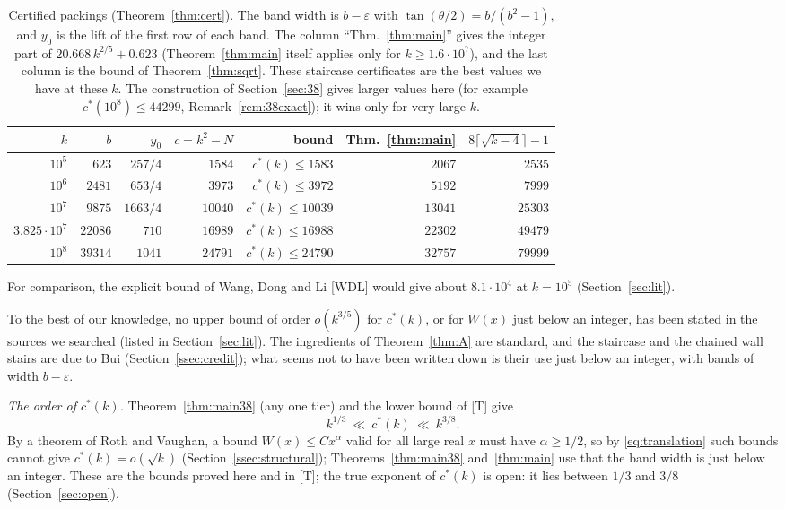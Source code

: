 \documentclass[11pt]{amsart}
\newcommand{\cs}{c^{*}}
\theoremstyle{definition}
\theoremstyle{remark}
\numberwithin{equation}{section}
\begin{document}
\begin{table}[ht]
\centering
\begin{tabular}{rrrrrrr}
\toprule
$k$ & $b$ & $y_0$ & $c=k^2-N$ & bound & Thm.~\ref{thm:main} & $8\lceil\sqrt{k-4}\rceil-1$\\
\midrule
$10^5$ & $623$ & $257/4$ & $1584$ & $\cs(k)\le1583$ & $2067$ & $2535$\\
$10^6$ & $2481$ & $653/4$ & $3973$ & $\cs(k)\le3972$ & $5192$ & $7999$\\
$10^7$ & $9875$ & $1663/4$ & $10040$ & $\cs(k)\le10039$ & $13041$ & $25303$\\
$3.825\cdot10^7$ & $22086$ & $710$ & $16989$ & $\cs(k)\le16988$ & $22302$ & $49479$\\
$10^8$ & $39314$ & $1041$ & $24791$ & $\cs(k)\le24790$ & $32757$ & $79999$\\
\bottomrule
\end{tabular}
\medskip
\caption{Certified packings (Theorem~\ref{thm:cert}). The band width is $b-\varepsilon$ with
$\tan(\theta/2)=b/(b^2-1)$, and $y_0$ is the lift of the first row of each band. The column ``Thm.~\ref{thm:main}''
gives the integer part of $20.668\,k^{2/5}+0.623$ (Theorem~\ref{thm:main} itself applies only for $k\ge1.6\cdot10^7$),
and the last column is the bound of Theorem~\ref{thm:sqrt}. These staircase certificates are the best values we have
at these $k$. The construction of Section~\ref{sec:38} gives larger values here (for example $\cs(10^8)\le44299$,
Remark~\ref{rem:38exact}); it wins only for very large $k$.}\label{tab:cert}
\end{table}

For comparison, the explicit bound of Wang, Dong and Li [WDL] would give about $8.1\cdot10^4$ at $k=10^5$
(Section~\ref{sec:lit}).

To the best of our knowledge, no upper bound of order $o(k^{3/5})$ for $\cs(k)$, or for $W(x)$ just below an integer,
has been stated in the sources we searched (listed in Section~\ref{sec:lit}). The ingredients of
Theorem~\ref{thm:A} are standard, and the staircase and the chained wall stairs are due to Bui
(Section~\ref{ssec:credit}); what seems not to have been written down is their use just below an integer, with bands of
width $b-\varepsilon$.

\emph{The order of $\cs(k)$.} Theorem~\ref{thm:main38} (any one tier) and the lower bound of [T] give
\[
k^{1/3}\ \ll\ \cs(k)\ \ll\ k^{3/8}.
\]
By a theorem of Roth and Vaughan, a bound $W(x)\le Cx^{\alpha}$ valid for all large real $x$ must have
$\alpha\ge1/2$, so by \eqref{eq:translation} such bounds cannot give $\cs(k)=o(\sqrt k)$
(Section~\ref{ssec:structural}); Theorems~\ref{thm:main38} and~\ref{thm:main} use that the band width is just below an
integer. These are the bounds proved here and in [T]; the true exponent of $\cs(k)$ is open: it lies between $1/3$ and
$3/8$ (Section~\ref{sec:open}).
\end{document}
